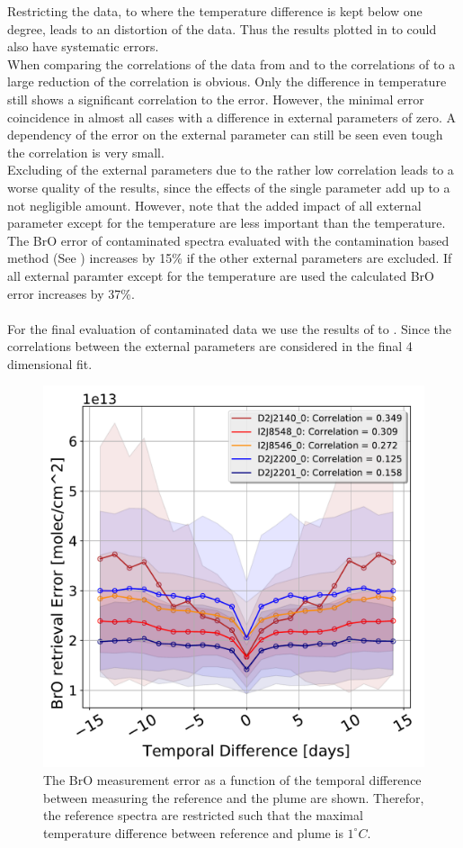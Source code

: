 \documentclass  [
  paper    = a4,
  BCOR     = 10mm,
  twoside,
  fontsize = 12pt,
  fleqn,
  toc      = bibnumbered,
  toc      = listofnumbered,
  numbers  = noendperiod,
  headings = normal,
  listof   = leveldown,
  version  = 3.03
]                                       {scrreprt}
\begin{document}
	Restricting the data, to where the temperature difference is kept below one degree, leads to an distortion of the data. Thus the results plotted in  to  could also have systematic errors.\\
	When comparing the correlations of the data from  and   to the correlations of 
	 to  a large reduction of the correlation is obvious. Only the difference in temperature still shows a significant correlation to the   error. However, the minimal   error coincidence in almost all cases with a difference in external parameters of zero. A dependency of the   error on the external parameter can still be seen even tough the correlation is very small. \\
	Excluding of the external parameters due to the rather low correlation leads to a worse quality of the results, since the effects of the single parameter add up to a not negligible amount. However, note that  the added impact of all external parameter except for the temperature are less important than the temperature.
	The BrO error of contaminated spectra evaluated with the contamination based method (See ) increases by 15\% if the other external parameters are excluded. If all external paramter except for the temperature are used the calculated BrO error increases by 37\%.\\
	\\
	For the final evaluation of contaminated data we use the results of  to . Since the correlations between the external parameters are considered in the final 4 dimensional fit.\\
	\begin{figure}[h]
		\centering
		\includegraphics[width=0.7\linewidth]{Bilder/BrOErr_OhnEVar/DatwithoutOtherparamallInstruments}
		\caption{The BrO measurement error as a function of the temporal difference between measuring the reference and the plume are shown. Therefor, the reference spectra are restricted such that the maximal temperature difference between reference and plume is $1^\circ C$.}
		\label{fig:datwithoutotherparamallinstruments}
	\end{figure}
\end{document}
